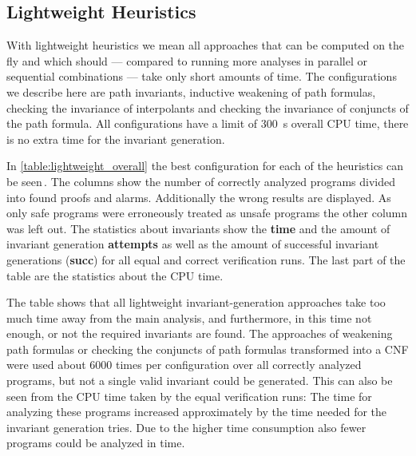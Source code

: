 \subsection{Lightweight Heuristics}
With lightweight heuristics we mean all approaches that can be computed on the fly and which should --- compared to running more analyses in parallel or sequential combinations --- take only short amounts of time. The configurations we describe here are path invariants, inductive weakening of path formulas, checking the invariance of interpolants and checking the invariance of conjuncts of the path formula. All configurations have a limit of \SI{300}{\second} overall CPU time, there is no extra time for the invariant generation.



In \autoref{table:lightweight_overall} the best configuration for each of the heuristics can be seen\,. The columns show the number of correctly analyzed programs divided into found proofs and alarms.
Additionally the wrong results are displayed. As only safe programs were erroneously treated as unsafe programs the other column was left out. The statistics about
invariants show the \textbf{time} and the amount of invariant generation \textbf{attempts} as well as the amount of successful invariant generations (\textbf{succ}) for all equal
and correct verification runs. The last part of the table are the statistics about the CPU time.

The table shows that all lightweight invariant-generation approaches take too much
time away from the main analysis, and furthermore, in this time not enough, or not the required invariants are found. The approaches of weakening path formulas or checking the conjuncts of
path formulas transformed into a \ac{CNF} were used about \num{6000} times per configuration over all correctly analyzed programs, but not a single valid invariant could be generated. This
can also be seen from the CPU time taken by the equal verification runs: The time for analyzing these programs increased approximately by the time needed for the invariant generation
tries. Due to the higher time consumption also fewer programs could be analyzed in time.

